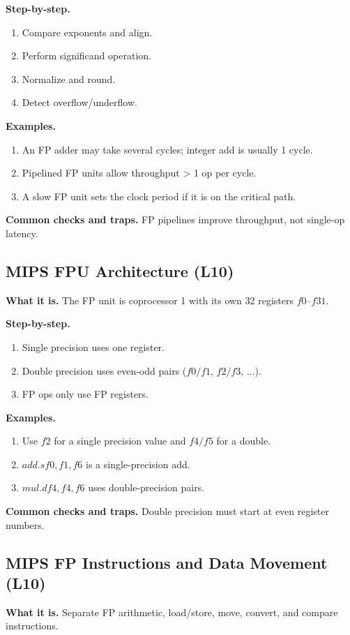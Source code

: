 \documentclass[11pt]{article}
\begin{document}
\textbf{Step-by-step.}
\begin{enumerate}[leftmargin=*]
  \item Compare exponents and align.
  \item Perform significand operation.
  \item Normalize and round.
  \item Detect overflow/underflow.
\end{enumerate}

\textbf{Examples.}
\begin{enumerate}[leftmargin=*]
  \item An FP adder may take several cycles; integer add is usually 1 cycle.
  \item Pipelined FP units allow throughput > 1 op per cycle.
  \item A slow FP unit sets the clock period if it is on the critical path.
\end{enumerate}

\textbf{Common checks and traps.} FP pipelines improve throughput, not single-op latency.

\subsection{MIPS FPU Architecture (L10)}
\textbf{What it is.} The FP unit is coprocessor 1 with its own 32 registers $f0$--$f31$.

\textbf{Step-by-step.}
\begin{enumerate}[leftmargin=*]
  \item Single precision uses one register.
  \item Double precision uses even-odd pairs ($f0/f1$, $f2/f3$, ...).
  \item FP ops only use FP registers.
\end{enumerate}

\textbf{Examples.}
\begin{enumerate}[leftmargin=*]
  \item Use $f2$ for a single precision value and $f4/f5$ for a double.
  \item $add.s f0, f1, f6$ is a single-precision add.
  \item $mul.d f4, f4, f6$ uses double-precision pairs.
\end{enumerate}

\textbf{Common checks and traps.} Double precision must start at even register numbers.

\subsection{MIPS FP Instructions and Data Movement (L10)}
\textbf{What it is.} Separate FP arithmetic, load/store, move, convert, and compare instructions.
\end{document}
